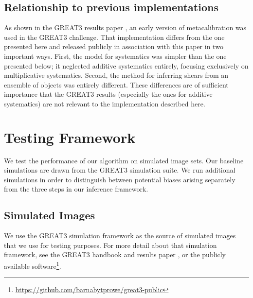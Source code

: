 \documentclass[iop]{emulateapj}
\begin{document}
\subsection{Relationship to previous implementations}

As shown in the GREAT3 results paper \citep{2015MNRAS.450.2963M}, an
early version of metacalibration was used in the GREAT3 challenge.
That implementation differs from the one presented here and released
publicly in association with this paper in two important ways.  First,
the model for systematics was simpler than the one presented below; it
neglected additive systematics entirely, focusing exclusively on
multiplicative systematics. Second, the method for inferring shears
from an ensemble of objects was entirely different.  These differences
are of sufficient importance that the GREAT3 results (especially the
ones for additive systematics) are not relevant to the implementation
described here.


\section{Testing Framework}
We test the performance of our algorithm on simulated image sets. Our
baseline simulations are drawn from the GREAT3 simulation suite. We
run additional simulations in order to distinguish between potential
biases arising separately from the three steps in our inference
framework.


\subsection{Simulated Images}

We use the GREAT3 simulation framework as the source of simulated
images that we use for testing purposes.  For more detail about that
simulation framework, see the GREAT3 handbook
\citep{2014ApJS..212....5M} and results paper
\citep{2015MNRAS.450.2963M}, or the publicly available
software\footnote{\url{https://github.com/barnabytprowe/great3-public}}.
\end{document}

